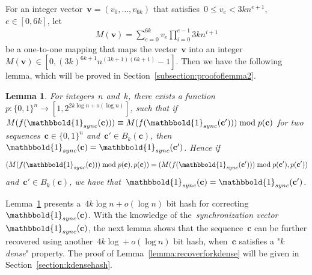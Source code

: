 \documentclass[10pt,a4paper,onecolumn]{IEEEtran}
\newtheorem{lemma}{Lemma}
\newcommand{\1}{\mathbbold{1}}
\newcommand{\boldc}{\mathbf{c}}
\newcommand{\boldv}{\mathbf{v}}
\begin{document}
For an integer vector~$\boldv=(v_0,\ldots,v_{6k})$ that satisfies~$0\le v_e< 3kn^{e+1}$,~$e\in [0,6k]$, 
let
\begin{align}\label{equation:Mfunction}
    M(\boldv)= \sum^{6k}_{e=0}v_e\prod^{e-1}_{i=0}3kn^{i+1}
\end{align}
be a one-to-one mapping that maps the vector~$\boldv$ into an integer~$M(\boldv)\in[0,(3k)^{6k+1}n^{(3k+1)(6k+1)}-1]$.
Then we have the following lemma, which will be proved in Section~\ref{subsection:proofoflemma2}. 
\begin{lemma}\label{lemma:protectingpattern}
For integers~$n$ and~$k$, there exists a function~$p:\{0,1\}^{n}\rightarrow [1,2^{2k\log n +o(\log n)}]$, such that
if~$M(f(\1_{sync}(\boldc)))\equiv M(f(\1_{sync}(\boldc')))\bmod p(\boldc)$ for two sequences~$\boldc\in\{0,1\}^n$ and~$\boldc'\in B_k(\boldc)$, then~$\1_{sync}(\boldc)=\1_{sync}(\boldc')$.
Hence if
\begin{align*}
(M(f(\1_{sync}(\boldc))) \bmod p(\boldc),p(\boldc))   
=(M(f(\1_{sync}(\boldc'))) \bmod p(\boldc'),p(\boldc'))
\end{align*}
and~$\boldc'\in B_k(\boldc)$, we have that~$\1_{sync}(\boldc)=\1_{sync}(\boldc')$.
\end{lemma}
Lemma~\ref{lemma:protectingpattern} presents a~$4k\log n +o(\log n)$ bit hash for correcting~$\1_{sync}(\boldc)$. With the knowledge of the~\emph{synchronization vector}~$\1_{sync}(\boldc)$,
the next lemma shows that the sequence~$\boldc$ can be further recovered using another~$4k\log +o(\log n)$ bit hash, when~$\boldc$ satisfies a "\emph{$k$ dense}" property. The proof of Lemma~\ref{lemma:recoverforkdense} will be given in Section~\ref{section:kdensehash}.
\end{document}
